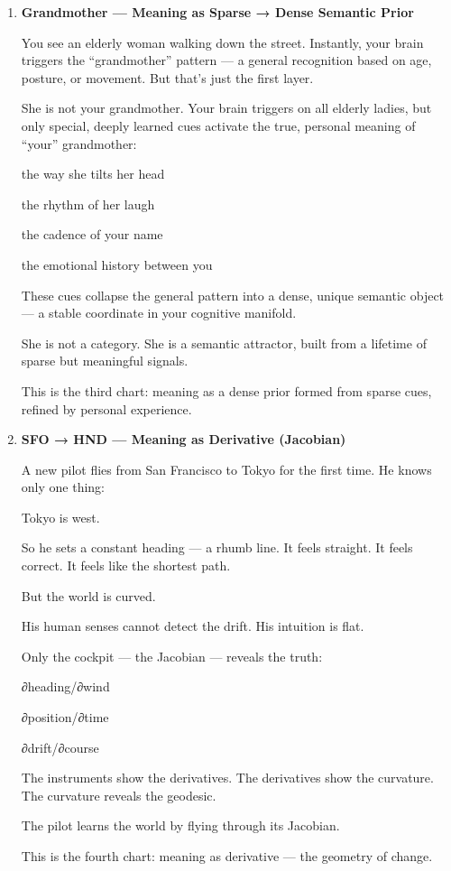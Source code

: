 \begin{enumerate}
  This is the second chart: meaning as globally reinforced, multimodal
  invariant.
\item
  \textbf{Grandmother --- Meaning as Sparse → Dense Semantic Prior}

  You see an elderly woman walking down the street. Instantly, your
  brain triggers the ``grandmother'' pattern --- a general recognition
  based on age, posture, or movement. But that's just the first layer.

  She is not your grandmother. Your brain triggers on all elderly
  ladies, but only special, deeply learned cues activate the true,
  personal meaning of ``your'' grandmother:

  the way she tilts her head

  the rhythm of her laugh

  the cadence of your name

  the emotional history between you

  These cues collapse the general pattern into a dense, unique semantic
  object --- a stable coordinate in your cognitive manifold.

  She is not a category. She is a semantic attractor, built from a
  lifetime of sparse but meaningful signals.

  This is the third chart: meaning as a dense prior formed from sparse
  cues, refined by personal experience.
\item
  \textbf{SFO → HND --- Meaning as Derivative (Jacobian)}

  A new pilot flies from San Francisco to Tokyo for the first time. He
  knows only one thing:

  Tokyo is west.

  So he sets a constant heading --- a rhumb line. It feels straight. It
  feels correct. It feels like the shortest path.

  But the world is curved.

  His human senses cannot detect the drift. His intuition is flat.

  Only the cockpit --- the Jacobian --- reveals the truth:

  ∂heading/∂wind

  ∂position/∂time

  ∂drift/∂course

  The instruments show the derivatives. The derivatives show the
  curvature. The curvature reveals the geodesic.

  The pilot learns the world by flying through its Jacobian.

  This is the fourth chart: meaning as derivative --- the geometry of
  change.
\end{enumerate}


